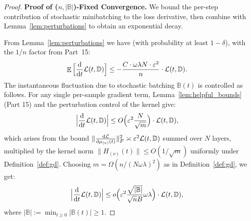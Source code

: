 \documentclass[11pt]{article}
\theoremstyle{plain}
\renewcommand{\d}{\mathrm{d}}
\DeclareMathOperator*{\E}{{\mathbb{E}}}
\begin{document}
\begin{proof}
    {\bf Proof of ($n, |\mathbb{B}|$)-Fixed Convergence.}
    We bound the per-step contribution of stochastic minibatching to the loss derivative, then combine with Lemma~\ref{lem:perturbations} to obtain an exponential decay.

    From Lemma~\ref{lem:perturbations} we have (with probability at least $1-\delta$), with the $1/n$ factor from Part~15:
    \begin{align}\label{eq:exp_decay_full}
        \E\Big[\frac{\d}{\d t}{\cal L}(t,\mathbb{D})\Big] \le -\frac{C\cdot\omega\lambda N\cdot \varepsilon^2}{n}\cdot {\cal L}(t,\mathbb{D}).
    \end{align}
    The instantaneous fluctuation due to stochastic batching $\mathbb{B}(t)$ is controlled as follows. For any single per-sample gradient term, Lemma~\ref{lem:helpful_bounds} (Part 15) and the perturbation control of the kernel give:
    \begin{align*}
        \Big| \frac{\d }{\d t} {\cal L}(t, \mathbb{D}) \Big| \leq O\Big(\varepsilon^2\frac{N}{\sqrt{m}}\Big) \cdot {\cal L}(t, \mathbb{D}),
    \end{align*}
    which arises from the bound $\|\frac{\d {\cal L}}{\d \mu_{(\nu)}(t)}\|^2_F\asymp \varepsilon^2 {\cal L}(t,\mathbb{D})$ summed over $N$ layers, multiplied by the kernel norm $\|H_{(\nu)}(t)\|\le O(1/\sqrt{m})$ uniformly under Definition~\ref{def:gd}. Choosing $m = \Omega(n/(N\omega\lambda)^2)$ as in Definition~\ref{def:gd}, we get:
    \begin{align*}
        \Big| \frac{\d }{\d t} {\cal L}(t, \mathbb{D}) \Big| \leq o\Big(\varepsilon^2 \frac{\sqrt{|\mathbb{B}|}}{\sqrt{n}B} \omega \lambda \Big) \cdot {\cal L}(t, \mathbb{D}),
    \end{align*}
    where $|\mathbb{B}| := \min_{t\ge 0} |\mathbb{B}(t)| \ge 1$.


\end{proof}
\end{document}
